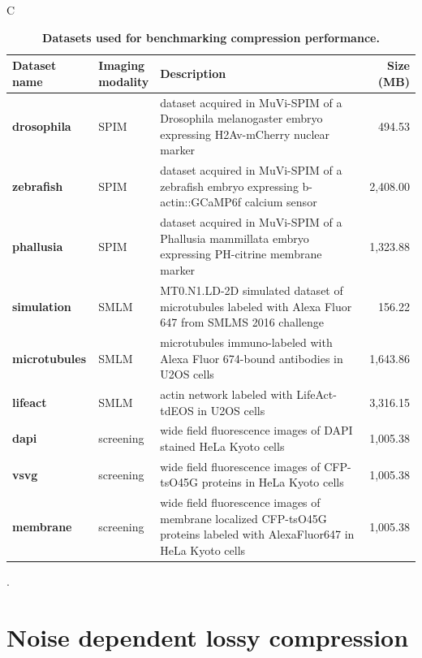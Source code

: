 \documentclass{diploma_style}
\begin{document}
\begin{table}[tbp]
\begin{small}
\renewcommand{\arraystretch}{2}C
\centering
\begin{tabular}{llp{7cm}r}
    \textbf{Dataset name} & \parbox[c]{2cm}{\textbf{Imaging\\modality}} & \textbf{Description} & \textbf{Size (MB)} \\
    \hline
    \hline
    \textbf{drosophila} & SPIM & dataset acquired in MuVi-SPIM of a Drosophila melanogaster embryo expressing H2Av-mCherry nuclear marker & 494.53 \\ \hline
    \textbf{zebrafish} & SPIM & dataset acquired in MuVi-SPIM of a zebrafish embryo expressing b-actin::GCaMP6f calcium sensor & 2,408.00 \\ \hline
    \textbf{phallusia} & SPIM & dataset acquired in MuVi-SPIM of a Phallusia mammillata embryo expressing PH-citrine membrane marker & 1,323.88  \\ \hline
    \textbf{simulation} & SMLM & MT0.N1.LD-2D simulated dataset of microtubules labeled with Alexa Fluor 647 from SMLMS 2016 challenge & 156.22 \\ \hline
    \textbf{microtubules} & SMLM & microtubules immuno-labeled with Alexa Fluor 674-bound antibodies in U2OS cells & 1,643.86  \\ \hline
    \textbf{lifeact} & SMLM & actin network labeled with LifeAct-tdEOS in U2OS cells & 3,316.15  \\ \hline
    \textbf{dapi} & screening & wide field fluorescence images of DAPI stained HeLa Kyoto cells \cite{simpson_genome-wide_2012} & 1,005.38 \\ \hline
    \textbf{vsvg} & screening & wide field fluorescence images of CFP-tsO45G proteins in HeLa Kyoto cells \cite{simpson_genome-wide_2012} & 1,005.38  \\ \hline
    \textbf{membrane} & screening & wide field fluorescence images of membrane localized CFP-tsO45G proteins labeled with AlexaFluor647 in HeLa Kyoto cells \cite{simpson_genome-wide_2012} & 1,005.38  \\ 
\end{tabular}
\caption{\textbf{Datasets used for benchmarking compression performance.}}.
\label{tab:datasets}
\end{small}
\end{table}

\section{Noise dependent lossy compression}
\end{document}
